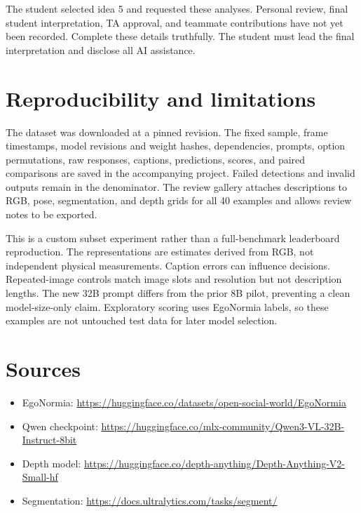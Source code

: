 \documentclass[10pt,twocolumn]{article}
\begin{document}
The student selected idea 5 and requested these analyses. Personal review, final student interpretation, TA approval, and teammate contributions have not yet been recorded. Complete these details truthfully. The student must lead the final interpretation and disclose all AI assistance.
\section*{Reproducibility and limitations}
The dataset was downloaded at a pinned revision. The fixed sample, frame timestamps, model revisions and weight hashes, dependencies, prompts, option permutations, raw responses, captions, predictions, scores, and paired comparisons are saved in the accompanying project. Failed detections and invalid outputs remain in the denominator. The review gallery attaches descriptions to RGB, pose, segmentation, and depth grids for all 40 examples and allows review notes to be exported.

This is a custom subset experiment rather than a full-benchmark leaderboard reproduction. The representations are estimates derived from RGB, not independent physical measurements. Caption errors can influence decisions. Repeated-image controls match image slots and resolution but not description lengths. The new 32B prompt differs from the prior 8B pilot, preventing a clean model-size-only claim. Exploratory scoring uses EgoNormia labels, so these examples are not untouched test data for later model selection.
\section*{Sources}
\begin{itemize}
\item EgoNormia: \url{https://huggingface.co/datasets/open-social-world/EgoNormia}
\item Qwen checkpoint: \url{https://huggingface.co/mlx-community/Qwen3-VL-32B-Instruct-8bit}
\item Depth model: \url{https://huggingface.co/depth-anything/Depth-Anything-V2-Small-hf}
\item Segmentation: \url{https://docs.ultralytics.com/tasks/segment/}
\end{itemize}
\end{document}
